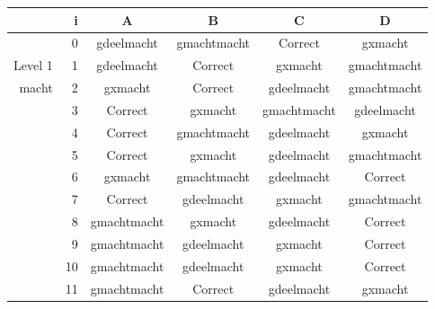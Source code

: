 \begin{tabular}{ rr| c|c|c|c}\hline\hline
     & i & \textbf{A} & \textbf{B} & \textbf{C} & \textbf{D}\\\hline

&0&gdeelmacht&gmachtmacht&Correct\cellcolor[gray]{0.6}&gxmacht\\
Level 1 & 1&gdeelmacht&Correct\cellcolor[gray]{0.6}&gxmacht&gmachtmacht\\
macht &2&gxmacht&Correct\cellcolor[gray]{0.6}&gdeelmacht&gmachtmacht\\
&3&Correct\cellcolor[gray]{0.6}&gxmacht&gmachtmacht&gdeelmacht\\
&4&Correct\cellcolor[gray]{0.6}&gmachtmacht&gdeelmacht&gxmacht\\
&5&Correct\cellcolor[gray]{0.6}&gxmacht&gdeelmacht&gmachtmacht\\
&6&gxmacht&gmachtmacht&gdeelmacht&Correct\cellcolor[gray]{0.6}\\
&7&Correct\cellcolor[gray]{0.6}&gdeelmacht&gxmacht&gmachtmacht\\
&8&gmachtmacht&gxmacht&gdeelmacht&Correct\cellcolor[gray]{0.6}\\
&9&gmachtmacht&gdeelmacht&gxmacht&Correct\cellcolor[gray]{0.6}\\
&10&gmachtmacht&gdeelmacht&gxmacht&Correct\cellcolor[gray]{0.6}\\
&11&gmachtmacht&Correct\cellcolor[gray]{0.6}&gdeelmacht&gxmacht\\
\hline\end{tabular}\par\ \newline

